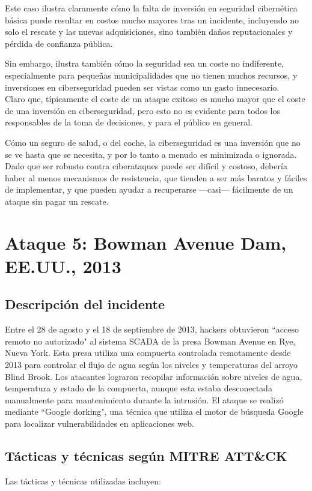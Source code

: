 Este caso ilustra claramente cómo la falta de inversión en seguridad cibernética básica puede resultar en costos mucho mayores tras un incidente, incluyendo no solo el rescate y las nuevas adquisiciones, sino también daños reputacionales y pérdida de confianza pública.

Sin embargo, ilustra también cómo la seguridad sea un coste no indiferente, especialmente para pequeñas municipalidades que no tienen muchos recursos, y inversiones en ciberseguridad pueden ser vistas como un gasto innecesario.\\
Claro que, típicamente el coste de un ataque exitoso es mucho mayor que el coste de una inversión en ciberseguridad, pero esto no es evidente para todos los responsables de la toma de decisiones, y para el público en general.

Cómo un seguro de salud, o del coche, la ciberseguridad es una inversión que no se ve hasta que se necesita, y por lo tanto a menudo es minimizada o ignorada.\\
Dado que ser robusto contra ciberataques puede ser difícil y costoso, debería haber al menos mecanismos de resistencia, que tienden a ser más baratos y fáciles de implementar, y que pueden ayudar a recuperarse ---casi--- fácilmente de un ataque sin pagar un rescate.
\section{Ataque 5: Bowman Avenue Dam, EE.UU., 2013}

\subsection{Descripción del incidente}
Entre el 28 de agosto y el 18 de septiembre de 2013, hackers obtuvieron ``acceso remoto no autorizado" al sistema SCADA de la presa Bowman Avenue en Rye, Nueva York. Esta presa utiliza una compuerta controlada remotamente desde 2013 para controlar el flujo de agua según los niveles y temperaturas del arroyo Blind Brook. Los atacantes lograron recopilar información sobre niveles de agua, temperatura y estado de la compuerta, aunque esta estaba desconectada manualmente para mantenimiento durante la intrusión. El ataque se realizó mediante ``Google dorking", una técnica que utiliza el motor de búsqueda Google para localizar vulnerabilidades en aplicaciones web.

\subsection{Tácticas y técnicas según MITRE ATT\&CK}
Las tácticas y técnicas utilizadas incluyen:

